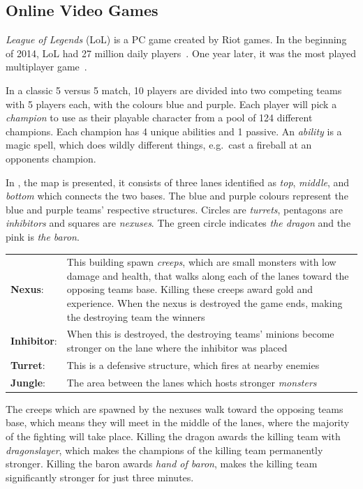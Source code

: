 \subsection{Online Video Games}\label{sec:onlinevideogames}



\emph{League of Legends} (LoL) is a PC game created by Riot games. In the beginning of 2014, LoL had 27 million daily players~\cite{LoL27mill}. One year later, it was the most played multiplayer game~\cite{LoLmostplayed}.

In a classic 5 versus 5 match, 10 players are divided into two competing teams with 5 players each, with the colours blue and purple. Each player will pick a \emph{champion} to use as their playable character from a pool of 124 different champions. Each champion has 4 unique abilities and 1 passive. An \emph{ability} is a magic spell, which does wildly different things, e.g.\ cast a fireball at an opponents champion. 


In , the map is presented, it consists of three lanes identified as \emph{top}, \emph{middle}, and \emph{bottom} which connects the two bases. The blue and purple colours represent the blue and purple teams' respective structures. Circles are \emph{turrets}, pentagons are \emph{inhibitors} and squares are \emph{nexuses}. The green circle indicates \emph{the dragon} and the pink is \emph{the baron}.

\begin{table}[!h]
  \begin{tabular}{l p{13cm}}
    \textbf{Nexus}: & This building spawn \emph{creeps}, which are small monsters with low damage and health, that walks along each of the lanes toward the opposing teams base. Killing these creeps award gold and experience. When the nexus is destroyed the game ends, making the destroying team the winners\\
    \textbf{Inhibitor}: & When this is destroyed, the destroying teams' minions become stronger on the lane where the inhibitor was placed\\
    \textbf{Turret}: & This is a defensive structure, which fires at nearby enemies\\
    \textbf{Jungle}: & The area between the lanes which hosts stronger \emph{monsters}\\
  \end{tabular}
\end{table}

The creeps which are spawned by the nexuses walk toward the opposing teams base, which means they will meet in the middle of the lanes, where the majority of the fighting will take place. Killing the dragon awards the killing team with \emph{dragonslayer}, which makes the champions of the killing team permanently stronger. Killing the baron awards \emph{hand of baron}, makes the killing team significantly stronger for just three minutes.


